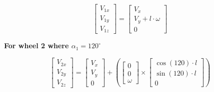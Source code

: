 \documentclass[answers]{exam}
\begin{document}
\begin{questions}
\begin{solution}
            \begin{equation} \label{eq:1}
                \begin{bmatrix}
                    V_{1x} \\
                    V_{1y} \\
                    V_{1z}
                \end{bmatrix}
                = \begin{bmatrix}
                    V_x                  \\
                    V_y + l \cdot \omega \\
                    0
                \end{bmatrix}
            \end{equation}

            \textbf{For wheel 2 where $\alpha_1 = 120^\circ$}

            \begin{equation*}
                \begin{bmatrix}
                    V_{2x} \\
                    V_{2y} \\
                    V_{2z}
                \end{bmatrix}
                = \begin{bmatrix}
                    V_x \\
                    V_y \\
                    0
                \end{bmatrix}
                + \left(\begin{bmatrix}
                    0 \\
                    0 \\
                    \omega
                \end{bmatrix} \times \begin{bmatrix}
                    \cos(120) \cdot l \\
                    \sin(120) \cdot l \\
                    0
                \end{bmatrix}\right)
            \end{equation*}


\end{solution}
\end{questions}
\end{document}
